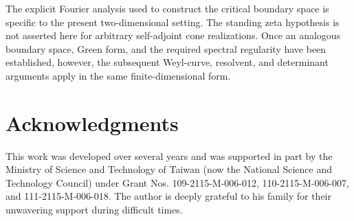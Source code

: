 \documentclass[12pt]{amsart}
\theoremstyle{plain}
\theoremstyle{definition}
\theoremstyle{remark}
\numberwithin{equation}{section} \numberwithin{figure}{section}
\begin{document}
The explicit Fourier analysis used to construct the critical boundary
space is specific to the present two-dimensional setting. The standing
zeta hypothesis is not asserted here for arbitrary self-adjoint cone
realizations. Once an analogous boundary space, Green form, and the
required spectral regularity have been established, however, the
subsequent Weyl-curve, resolvent, and determinant arguments apply in
the same finite-dimensional form.


\section*{Acknowledgments}

This work was developed over several years and was supported in part by the
Ministry of Science and Technology of Taiwan (now the National Science and
Technology Council) under Grant Nos. 109-2115-M-006-012,
110-2115-M-006-007, and 111-2115-M-006-018. The author is deeply grateful to
his family for their unwavering support during difficult times.
\end{document}

